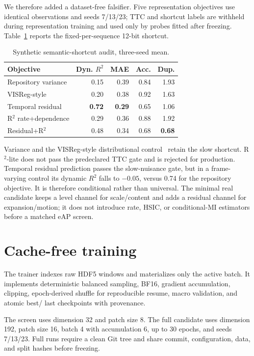 \documentclass[10pt,twocolumn]{article}
\begin{document}
We therefore added a dataset-free falsifier. Five representation objectives use
identical observations and seeds 7/13/23; TTC and shortcut labels are withheld
during representation training and used only by probes fitted after freezing.
Table~\ref{tab:semantic} reports the fixed-per-sequence 12-bit shortcut.

\begin{table}[t]
\centering
\caption{Synthetic semantic-shortcut audit, three-seed mean.}
\label{tab:semantic}
\scriptsize
\begin{tabular}{lrrrr}
\toprule
Objective & Dyn. $R^2$ & MAE & Acc. & Dup. \\
\midrule
Repository variance & 0.15 & 0.39 & 0.84 & 1.93 \\
VISReg-style & 0.20 & 0.38 & 0.92 & 1.63 \\
Temporal residual & \textbf{0.72} & \textbf{0.29} & 0.65 & 1.06 \\
R$^2$ rate+dependence & 0.29 & 0.36 & 0.88 & 1.92 \\
Residual+R$^2$ & 0.48 & 0.34 & 0.68 & \textbf{0.68} \\
\bottomrule
\end{tabular}
\end{table}

Variance and the VISReg-style distributional control~\cite{visreg2026} retain the
slow shortcut. R$^2$-lite does not pass the predeclared TTC gate and is rejected
for production. Temporal residual prediction passes the slow-nuisance gate, but
in a frame-varying control its dynamic $R^2$ falls to $-0.05$, versus 0.74 for the
repository objective. It is therefore conditional rather than universal. The
minimal real candidate keeps a level channel for scale/content and adds a residual
channel for expansion/motion; it does not introduce rate, HSIC, or conditional-MI
estimators before a matched eAP screen.

\section{Cache-free training}

The trainer indexes raw HDF5 windows and materializes only the active batch. It
implements deterministic balanced sampling, BF16, gradient accumulation, clipping,
epoch-derived shuffle for reproducible resume, macro validation, and atomic best/
last checkpoints with provenance.

The screen uses dimension 32 and patch size 8. The full candidate uses dimension
192, patch size 16, batch 4 with accumulation 6, up to 30 epochs, and seeds
7/13/23. Full runs require a clean Git tree and share commit, configuration, data,
and split hashes before freezing.
\end{document}
